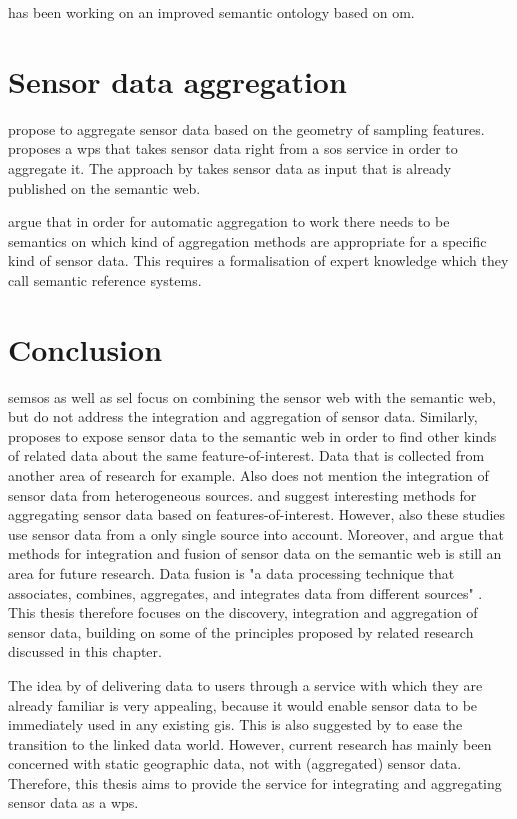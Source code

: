 \cite{SSW:Cox3} has been working on an improved semantic ontology based on \ac{om}.

\section{Sensor data aggregation}
\cite{SSW:Stasch} propose to aggregate sensor data based on the geometry of sampling features. \cite{SSW:Stasch3} proposes a \ac{wps} that takes sensor data right from a \ac{sos} service in order to aggregate it. The approach by \cite{SSW:Stasch} takes sensor data as input that is already published on the semantic web.

\cite{SSW:Stasch4} argue that in order for automatic aggregation to work there needs to be semantics on which kind of aggregation methods are appropriate for a specific kind of sensor data. This requires a formalisation of expert knowledge which they call semantic reference systems.

\section{Conclusion}
\ac{semsos} \citep{SSW:Henson, SSW:Pschorr} as well as \ac{sel} \citep{SSW:Janowicz} focus on combining the sensor web with the semantic web, but do not address the integration and aggregation of sensor data. Similarly, \cite{SSW:Atkinson} proposes to expose sensor data to the semantic web in order to find other kinds of related data about the same feature-of-interest. Data that is collected from another area of research for example. Also \cite{SSW:Atkinson} does not mention the integration of sensor data from heterogeneous sources. \cite{SSW:Stasch} and \cite{SSW:Stasch3} suggest interesting methods for aggregating sensor data based on features-of-interest. However, also these studies use sensor data from a only single source into account. Moreover, \cite{SSW:Corcho} and \cite{SSW:Ji} argue that methods for integration and fusion of sensor data on the semantic web is still an area for future research. Data fusion is "a data processing technique that associates, combines, aggregates, and integrates data from different sources" \cite[p. 2]{SSW:Wang2}. This thesis therefore focuses on the discovery, integration and aggregation of sensor data, building on some of the principles proposed by related research discussed in this chapter.  

The idea by \cite{SW:Jones} of delivering data to users through a service with which they are already familiar is very appealing, because it would enable sensor data to be immediately used in any existing \ac{gis}. This is also suggested by \cite{SSW:Atkinson} to ease the transition to the linked data world. However, current research has mainly been concerned with static geographic data, not with (aggregated) sensor data. Therefore, this thesis aims to provide the service for integrating and aggregating sensor data as a \ac{wps}.

